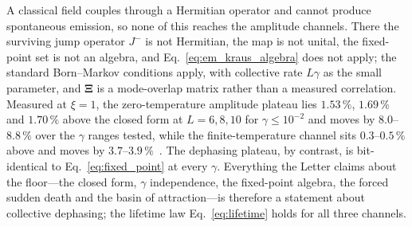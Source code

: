 \documentclass[aps,prl,reprint,amsmath,amssymb,floatfix]{revtex4-2}
\begin{document}
A classical field couples through a Hermitian operator and cannot produce
spontaneous emission, so none of this reaches the amplitude channels. There the
surviving jump operator $J^-$ is not Hermitian, the map is not unital, the
fixed-point set is not an algebra, and Eq.~\eqref{eq:em_kraus_algebra} does not
apply; the standard Born--Markov conditions apply, with collective rate
$L\gamma$ as the small parameter, and $\bm\Xi$ is a mode-overlap matrix rather
than a measured correlation. Measured at $\xi=1$, the zero-temperature
amplitude plateau lies $1.53\,\%$, $1.69\,\%$ and $1.70\,\%$ above the closed
form at $L=6,8,10$ for $\gamma\le10^{-2}$ and moves by $8.0$--$8.8\,\%$ over
the $\gamma$ ranges tested, while the finite-temperature channel sits
$0.3$--$0.5\,\%$ above and moves by $3.7$--$3.9\,\%$~\cite{SM}. The dephasing
plateau, by contrast, is bit-identical to Eq.~\eqref{eq:fixed_point} at every
$\gamma$. Everything the Letter claims about the floor---the closed form,
$\gamma$ independence, the fixed-point algebra, the forced sudden death and the
basin of attraction---is therefore a statement about collective dephasing;
the lifetime law Eq.~\eqref{eq:lifetime} holds for all three channels.
\end{document}
